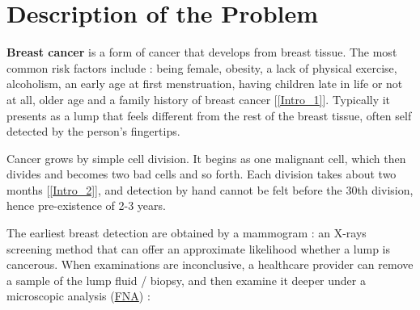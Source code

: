 \documentclass[12pt]{article}
\renewcommand{\baselinestretch}{1.2}
\numberwithin{equation}{section}
\begin{document}
\begin{flushleft} 
\begingroup
\hypersetup{linkcolor=black}
\renewcommand{\baselinestretch}{0.85}\normalsize
\tableofcontents 
\renewcommand{\baselinestretch}{1.0}\normalsize
\endgroup 				%
\newpage

\hypersetup{linkcolor=red}



\section{Description of the Problem}

\textbf{Breast cancer} is a form of cancer that develops from breast tissue. The most common risk factors include : being female, obesity, a lack of physical exercise, alcoholism, an early age at first menstruation, having children late in life or not at all, older age and a family history of breast cancer [\ref{Intro_1}]. Typically it presents as a lump that feels different from the rest of the breast tissue, often self detected by the person's fingertips.

Cancer grows by simple cell division. It begins as one malignant cell, which then divides and becomes two bad cells and so forth. Each division takes about two months [\ref{Intro_2}], and detection by hand cannot be felt before the 30th division, hence pre-existence of 2-3 years. 

The earliest breast detection are obtained by a mammogram : an X-rays screening method that can offer an approximate likelihood whether a lump is cancerous. When examinations are inconclusive, a healthcare provider can remove a sample of the lump fluid / biopsy, and then examine it deeper under a microscopic analysis (\href{https://en.wikipedia.org/wiki/Fine-needle_aspiration}{FNA}) : \vspace{0.6cm}


\end{flushleft}
\end{document}
